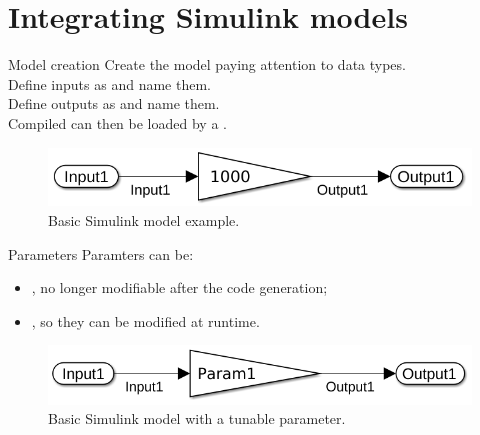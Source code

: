
\section{Integrating Simulink models}
\graphicspath{{figs/section5/}}

\begin{frame}{Model creation}
	Create the model paying attention to data types.\\
  \bigskip
	Define inputs as  and name them.\\
  \bigskip
	Define outputs as  and name them.\\
  \bigskip
  Compiled  can then be loaded by a .
	\vspace{0.5cm}
	\begin{figure}
		\centering
		\includegraphics[scale=0.4]{Model.png}
		\caption{Basic Simulink model example.}
		\label{fig:model}
	\end{figure}
\end{frame}

\begin{frame}{Parameters}
	Paramters can be:
	\begin{itemize}
		\item {}, no longer modifiable after the code generation;
		\item {}, so they can be modified at runtime.
	\end{itemize}
	\vspace{0.5cm}
	\begin{figure}
		\centering
		\includegraphics[scale=0.4]{ModelParam.png}
		\caption{Basic Simulink model with a tunable parameter.}
		\label{fig:model_param}
	\end{figure}
\end{frame}

